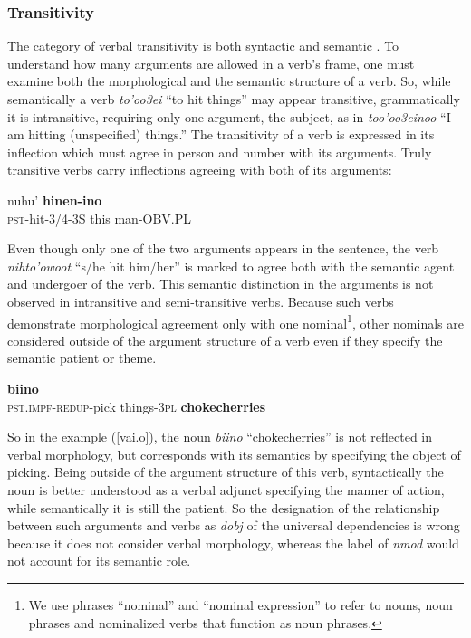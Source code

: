 \documentclass[11pt]{article}
\begin{document}
\subsubsection{Transitivity}
The category of verbal transitivity is both syntactic and semantic \cite{Cow08}. To understand how many arguments are allowed in a verb's frame, one must examine both the morphological and the semantic structure of a verb. So, while semantically a verb \textit{to'oo3ei } ``to hit things'' may appear transitive, grammatically it is intransitive, requiring only one argument, the subject, as in \textit{too'oo3einoo} ``I am hitting (unspecified) things.'' The transitivity of a verb is expressed in its inflection which must agree in person and number with its arguments. Truly transitive verbs carry inflections agreeing with both of its arguments:
\begin{exe}
\ex \label{trans} 
\small
{} nuhu' \textbf{hinen-ino}\\
{\textsc{pst}-hit-\textsc{3/4-3S}} this man-OBV.PL\\
\end{exe}
\normalsize
Even though only one of the two arguments appears in the sentence, the verb \textit{nihto'owoot} ``s/he hit him/her'' is marked to agree both with the semantic agent and undergoer of the verb. This semantic distinction in the arguments is not observed in intransitive and semi-transitive verbs. Because such verbs demonstrate morphological agreement only with one nominal\footnote{We use  phrases ``nominal'' and ``nominal expression'' to refer to nouns, noun phrases and nominalized verbs that function as noun phrases.}, other nominals are considered outside of the argument structure of a verb even if they specify the semantic patient or theme. 

\small
\begin{exe}
\ex \label{vai.o} 
 \textbf{biino}\\
{\textsc{pst.impf}-\textsc{redup}-pick things-3\textsc{pl}}  \textbf{chokecherries}\\
\end{exe}
\normalsize
So in the example (\ref{vai.o}), the noun \textit{biino} ``chokecherries'' is not reflected in verbal morphology, but corresponds with its semantics by specifying the object of picking. Being outside of the argument structure of this verb, syntactically the noun is better understood as a verbal adjunct specifying the manner of action, while semantically it is still the patient. So the designation of the relationship between such arguments and verbs as \textit{dobj} of the universal dependencies is wrong because it does not consider verbal morphology, whereas the label of \textit{nmod} would not account for its semantic role.
\end{document}
